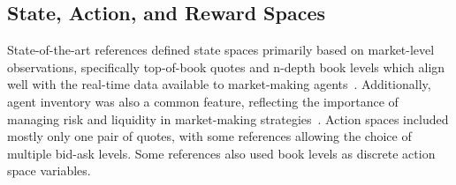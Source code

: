 \subsection{State, Action, and Reward Spaces}
\label{subsec:state-action-and-reward-spaces}
State-of-the-art references defined state spaces primarily based on market-level observations,
specifically top-of-book quotes and n-depth book levels which align well with the real-time data available to market-making agents~\cite{he2023integrating, Bakshaev2020}.
Additionally, agent inventory was also a common feature, reflecting the importance of managing risk and liquidity in market-making strategies~\cite{patel2018optimizing, Ganesh2019}.
Action spaces included mostly only one pair of quotes, with some references allowing the choice of multiple bid-ask levels.
Some references also used book levels as discrete action space variables.

